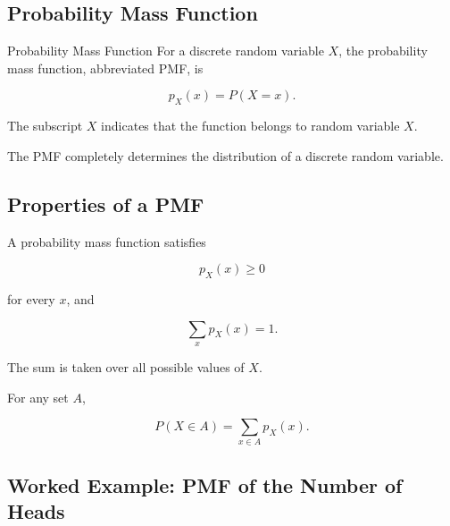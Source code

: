 \subsection{Probability Mass Function}
\label{subsec:probability-mass-function}

\begin{definitionbox}{Probability Mass Function}
For a discrete random variable \(X\), the probability mass function,
abbreviated PMF, is

\[
\boxed{
p_X(x)
=
P(X=x).
}
\]
\end{definitionbox}

The subscript \(X\) indicates that the function belongs to random
variable \(X\).

The PMF completely determines the distribution of a discrete random
variable.

\subsection{Properties of a PMF}
\label{subsec:pmf-properties}

A probability mass function satisfies

\[
\boxed{
p_X(x)\geq0
}
\]

for every \(x\), and

\[
\boxed{
\sum_x p_X(x)=1.
}
\]

The sum is taken over all possible values of \(X\).

For any set \(A\),

\[
\boxed{
P(X\in A)
=
\sum_{x\in A}p_X(x).
}
\]

\subsection{Worked Example: PMF of the Number of Heads}
\label{subsec:worked-pmf-heads}

